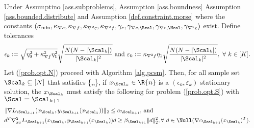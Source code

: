 \begin{theorem}
Under Assumptino \ref{ass.subproblems}, Assumption \ref{ass.boundness}  Assumption \ref{ass.bounded.distribute} and Assumption \ref{def.constraint.morse} where the constants $(\sigma_{\min}, \kappa_{\nabla c},\kappa_{\nabla f},\kappa_{\nabla^2 c},\kappa_{\nabla^2 f},\gamma_c,\gamma_{\nabla c, \Rcal},\gamma_{\nabla c, \Ncal},\gamma_{\nabla^2 c} )$ exist.  Define tolerances 
\[
\epsilon_k:=\sqrt{\eta_0^2+\kappa_{\nabla f}^2\eta_1^2}\sqrt{\frac{N(N-|\Scal_k|)}{|\Scal_k|^2}}\text{ and }\varepsilon_k:= \kappa_{\nabla^2f}\eta_1\sqrt{\frac{N(N-|\Scal_k|)}{|\Scal_k|^2}},\ \forall\ k\in[K].
\]
Let (\ref{prob.opt.N}) proceed with Algorithm \ref{alg.pcsm}. Then, for all sample set $\Scal_k\subseteq[N]$ that satisfies
\bequation
\label{eq.theorem2.S}
\le
\min\left\{,,\right\},
\eequation
if $x_{\Scal_k}\in\R{n}$ is a $(\epsilon_k,\varepsilon_k)$ stationary solution, the $x_{\Scal_k}$ must satisfy the following for problem (\ref{prob.opt.S}) with $\Scal=\Scal_{k+1}$
\begin{align*}
	&\|\nabla L_{\Scal_{k+1}}(x_{\Scal_{k}},y_{\Scal_{k+1}}(x_{\Scal_k}))\|_2 \le\alpha_{\Scal_{k+1}}\text{, and }\\
	& d^T\nabla^2_{xx}L_{\Scal_{k+1}}(x_{\Scal_{k}},y_{\Scal_{k+1}}(x_{\Scal_k}))d\ge \beta_{\Scal_{k+1}}\|d\|_2^2,\forall \ d\in\Null(\nabla c_{\Scal_{k+1}}(x_{\Scal_k})^T).
\end{align*}
\end{theorem}

